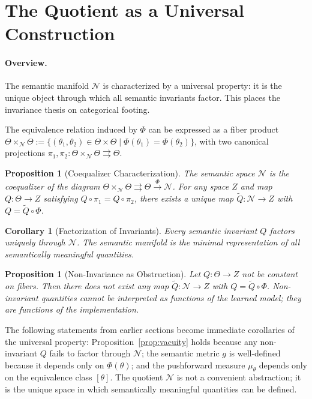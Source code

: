 \documentclass[twocolumn,10pt]{article}
\theoremstyle{thmstyle}
\newtheorem{corollary}[theorem]{Corollary}
\newtheorem{proposition}[theorem]{Proposition}
\theoremstyle{defstyle}
\begin{document}
\section{The Quotient as a Universal Construction}
\label{sec:categorical}

\paragraph{Overview.}
The semantic manifold $\mathcal{N}$ is characterized by a universal
property: it is the unique object through which all semantic invariants
factor. This places the invariance thesis on categorical footing.

The equivalence relation induced by $\Phi$ can be expressed as a fiber
product
$\Theta \times_{\mathcal{N}} \Theta :=
\{(\theta_1,\theta_2) \in \Theta \times \Theta \mid
\Phi(\theta_1) = \Phi(\theta_2)\}$,
with two canonical projections $\pi_1, \pi_2 :
\Theta \times_{\mathcal{N}} \Theta \rightrightarrows \Theta$.

\begin{proposition}[Coequalizer Characterization]
\label{prop:coequalizer}
The semantic space $\mathcal{N}$ is the coequalizer of the diagram
$\Theta \times_{\mathcal{N}} \Theta
\rightrightarrows \Theta \xrightarrow{\Phi} \mathcal{N}$.
For any space $Z$ and map $Q : \Theta \to Z$ satisfying
$Q \circ \pi_1 = Q \circ \pi_2$, there exists a unique map
$\tilde Q : \mathcal{N} \to Z$ with $Q = \tilde Q \circ \Phi$.
\end{proposition}

\begin{corollary}[Factorization of Invariants]
\label{cor:factorization}
Every semantic invariant $Q$ factors uniquely through $\mathcal{N}$.
The semantic manifold is the minimal representation of all semantically
meaningful quantities.
\end{corollary}

\begin{proposition}[Non-Invariance as Obstruction]
Let $Q : \Theta \to Z$ not be constant on fibers. Then there does not
exist any map $\tilde Q : \mathcal{N} \to Z$ with $Q = \tilde Q \circ \Phi$.
Non-invariant quantities cannot be interpreted as functions of the
learned model; they are functions of the implementation.
\end{proposition}

The following statements from earlier sections become immediate
corollaries of the universal property: Proposition~\ref{prop:vacuity}
holds because any non-invariant $Q$ fails to factor through $\mathcal{N}$;
the semantic metric $g$ is well-defined because it depends only on
$\Phi(\theta)$; and the pushforward measure $\mu_\theta$ depends only on
the equivalence class $[\theta]$. The quotient $\mathcal{N}$ is not a
convenient abstraction; it is the unique space in which semantically
meaningful quantities can be defined.
\end{document}
